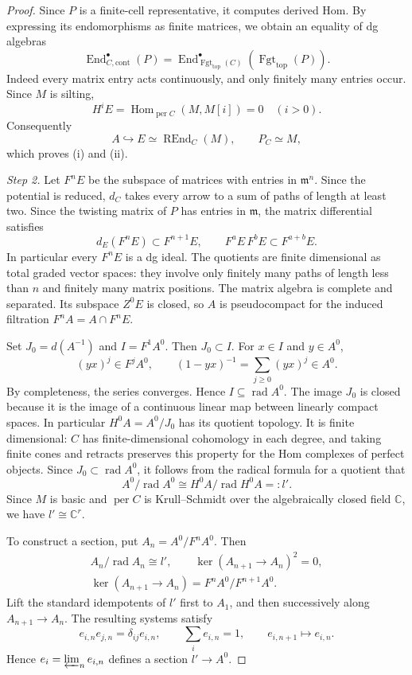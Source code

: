 \documentclass[12pt,a4paper,english,reqno]{amsart}
\theoremstyle{plain}
\theoremstyle{definition}
\numberwithin{equation}{section}
\def\Hom{\operatorname{Hom}}
\def\rad{\operatorname{rad}}
\def\End{\operatorname{End}}
\def\perf{\operatorname{per}}
\def\bbC{{\mathbb C}}
\def\iso{\cong}
\newcommand{\Fgt}{\operatorname{Fgt}}
\def\REnd{\operatorname{REnd}}
\begin{document}
\begin{proof}
Since $P$ is a finite-cell representative, it computes derived Hom. By expressing its endomorphisms as finite matrices, we obtain an equality of dg algebras
\[
 \End^\bullet_{C,\mathrm{cont}}(P)
 =\End^\bullet_{\Fgt_{\mathrm{top}}(C)}(\Fgt_{\mathrm{top}}(P)).
\]
Indeed every matrix entry acts continuously, and only finitely many entries occur. Since $M$ is silting,
\[
 H^iE=\Hom_{\perf C}(M,M[i])=0\quad(i>0).
\]
Consequently
\[
 A\hookrightarrow E\simeq\REnd_C(M),\qquad P_C\simeq M,
\]
which proves (i) and (ii).

\medskip\noindent\emph{Step 2.}
Let $F^nE$ be the subspace of matrices with entries in $\mathfrak m^n$. Since the potential is reduced, $d_C$ takes every arrow to a sum of paths of length at least two. Since the twisting matrix of $P$ has entries in $\mathfrak m$, the matrix differential satisfies
\[
 d_E(F^nE)\subset F^{n+1}E,\qquad
 F^aE\,F^bE\subset F^{a+b}E.
\]
In particular every $F^nE$ is a dg ideal. The quotients are finite dimensional as total graded vector spaces: they involve only finitely many paths of length less than $n$ and finitely many matrix positions. The matrix algebra is complete and separated. Its subspace $Z^0E$ is closed, so $A$ is pseudocompact for the induced filtration $F^nA=A\cap F^nE$.

Set $J_0=d(A^{-1})$ and $I=F^1A^0$. Then $J_0\subset I$. For $x\in I$ and $y\in A^0$,
\[
 (yx)^j\in F^jA^0,\qquad
 (1-yx)^{-1}=\sum_{j\ge0}(yx)^j\in A^0.
\]
By completeness, the series converges. Hence $I\subseteq\rad A^0$. The image $J_0$ is closed because it is the image of a continuous linear map between linearly compact spaces. In particular $H^0A=A^0/J_0$ has its quotient topology. It is finite dimensional: $C$ has finite-dimensional cohomology in each degree, and taking finite cones and retracts preserves this property for the Hom complexes of perfect objects. Since $J_0\subset\rad A^0$, it follows from the radical formula for a quotient that
\[
 A^0/\rad A^0\iso
 H^0A/\rad H^0A=:l'.
\]
Since $M$ is basic and $\perf C$ is Krull--Schmidt over the algebraically closed field $\bbC$, we have $l'\iso\bbC^r$.

To construct a section, put $A_n=A^0/F^nA^0$. Then
\[
 \begin{gathered}
 A_n/\rad A_n\cong l',\qquad \ker(A_{n+1}\to A_n)^2=0,\\
 \ker(A_{n+1}\to A_n)=F^nA^0/F^{n+1}A^0.
 \end{gathered}
\]
Lift the standard idempotents of $l'$ first to $A_1$, and then
successively along $A_{n+1}\to A_n$. The resulting systems satisfy
\[
 e_{i,n}e_{j,n}=\delta_{ij}e_{i,n},\qquad
 \sum_i e_{i,n}=1,\qquad e_{i,n+1}\longmapsto e_{i,n}.
\]
Hence $e_i=\varprojlim_n e_{i,n}$ defines a section $l'\to A^0$.


\end{proof}
\end{document}
